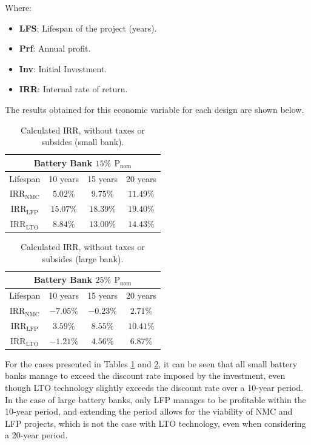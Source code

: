 Where:

\begin{itemize}
	\item \textbf{LFS}: Lifespan of the project (years).
	\item \textbf{Prf}: Annual profit.
	\item \textbf{Inv}: Initial Investment.
	\item \textbf{IRR}: Internal rate of return.
\end{itemize}

The results obtained for this economic variable for each design are shown below.

\begin{table}[H]
	\centering
	\caption{Calculated IRR, without taxes or subsides (small bank).}
	\label{tab:tir1}
	\begin{tabular}{|c|c|c|c|}
		\hline
		\multicolumn{4}{|c|}{Battery Bank $15\%$ ${\text{P}}_{\text{nom}}$} \\
		\hline\hline
	Lifespan  & 10 years & 15 years & 20 years\\
		 \hline
    ${\text{IRR}}_{\text{NMC}}$ & $5.02\%$ & $9.75\%$ & $11.49\%$ \\
		 \hline
	${\text{IRR}}_{\text{LFP}}$ & $15.07\%$ & $18.39\%$ & $19.40\%$\\
		 \hline
 	${\text{IRR}}_{\text{LTO}}$ & $8.84\%$ & $13.00\%$ & $14.43\%$\\
		 \hline
	\end{tabular}
\end{table}


\begin{table}[H]
	\centering
	\caption{Calculated IRR, without taxes or subsides (large bank).}
	\label{tab:tir2}
	\begin{tabular}{|c|c|c|c|}
		\hline
		\multicolumn{4}{|c|}{Battery Bank $25\%$ ${\text{P}}_{\text{nom}}$} \\
		\hline\hline
	Lifespan  & 10 years & 15 years & 20 years\\
		 \hline
    ${\text{IRR}}_{\text{NMC}}$ & $-7.05\%$ & $-0.23\%$ & $2.71\%$ \\
		 \hline
	${\text{IRR}}_{\text{LFP}}$ & $3.59\%$ & $8.55\%$ & $10.41\%$\\
		 \hline
 	${\text{IRR}}_{\text{LTO}}$ & $-1.21\%$ & $4.56\%$ & $6.87\%$\\
		 \hline
	\end{tabular}
\end{table}

For the cases presented in Tables \ref{tab:tir1} and \ref{tab:tir2}, it can be seen that all small battery banks manage to exceed the discount rate imposed by the investment, even though LTO technology slightly exceeds the discount rate over a 10-year period. In the case of large battery banks, only LFP manages to be profitable within the 10-year period, and extending the period allows for the viability of NMC and LFP projects, which is not the case with LTO technology, even when considering a 20-year period.

